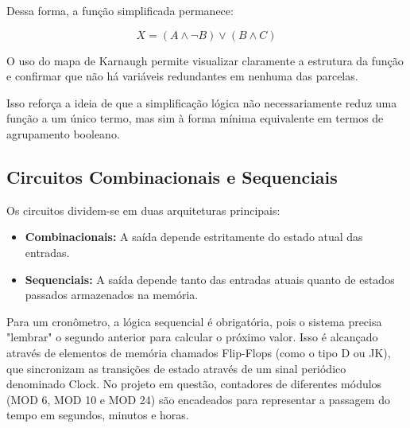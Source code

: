 Dessa forma, a função simplificada permanece:

\[
X = (A \land \lnot B) \lor (B \land C)
\]

O uso do mapa de Karnaugh permite visualizar claramente a estrutura da função e confirmar que não há variáveis redundantes em nenhuma das parcelas.

Isso reforça a ideia de que a simplificação lógica não necessariamente reduz uma função a um único termo, mas sim à forma mínima equivalente em termos de agrupamento booleano.


\subsection{Circuitos Combinacionais e Sequenciais}

Os circuitos dividem-se em duas arquiteturas principais: 

\begin{itemize}
 \item \textbf{Combinacionais:} A saída depende estritamente do estado atual das entradas.
 \item \textbf{Sequenciais:} A saída depende tanto das entradas atuais quanto de estados passados armazenados na memória. 
\end{itemize} 

Para um cronômetro, a lógica sequencial é obrigatória, pois o sistema precisa "lembrar" o segundo anterior para calcular o próximo valor. 
Isso é alcançado através de elementos de memória chamados Flip-Flops (como o tipo D ou JK), que sincronizam as transições de estado através de um sinal periódico denominado Clock. 
No projeto em questão, contadores de diferentes módulos (MOD 6, MOD 10 e MOD 24) são encadeados para representar a passagem do tempo em segundos, minutos e horas.
